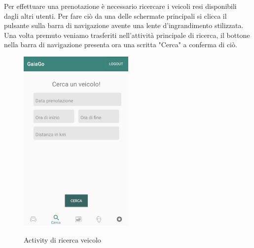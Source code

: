 Per effettuare una prenotazione è necessario ricercare i veicoli resi disponibili dagli altri utenti. Per fare ciò da una delle schermate principali si clicca il pulsante sulla barra di navigazione avente una lente d'ingrandimento stilizzata. Una volta premuto veniamo trasferiti nell'attività principale di ricerca, il bottone nella barra di navigazione presenta ora una scritta "Cerca" a conferma di ciò.
  \begin{figure}[H] 
 	\centering 
 	\includegraphics[width=0.5\textwidth]{res/images/cerca_veicolo.png}\\
 	\caption{Activity di ricerca veicolo}
 	\label{ricerca}
 \end{figure}
\pagebreak

